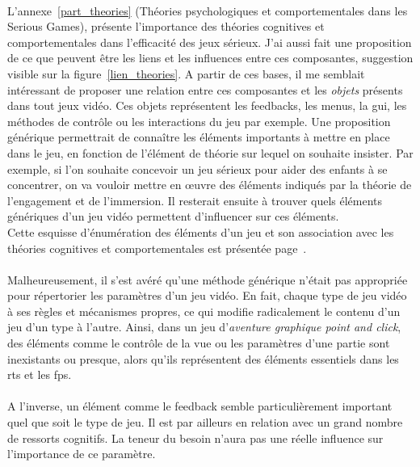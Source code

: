 	\paragraph{}
L'annexe~\ref{part_theories} (Théories psychologiques et comportementales dans les Serious Games), présente l'importance des théories cognitives et comportementales dans l'efficacité des jeux sérieux. J'ai aussi fait une proposition de ce que peuvent être les liens et les influences entre ces composantes, suggestion visible sur la figure~\ref{lien_theories}. A partir de ces bases, il me semblait intéressant de proposer une relation entre ces composantes et les \emph{objets} présents dans tout jeux vidéo. Ces objets représentent les \glspl{feedback}, les menus, la \gls{gui}, les méthodes de contrôle ou les interactions du jeu par exemple. Une proposition générique permettrait de connaître les éléments importants à mettre en place dans le jeu, en fonction de l'élément de théorie sur lequel on souhaite insister. Par exemple, si l'on souhaite concevoir un jeu sérieux pour aider des enfants à se concentrer, on va vouloir mettre en œuvre des éléments indiqués par la théorie de l'engagement et de l'immersion. Il resterait ensuite à trouver quels éléments génériques d'un jeu vidéo permettent d'influencer sur ces éléments.\\
Cette esquisse d'énumération des éléments d'un jeu et son association avec les théories cognitives et comportementales est présentée page~\pageref{matching}. 

\paragraph{}Malheureusement, il s'est avéré qu'une méthode générique n'était pas appropriée pour répertorier les paramètres d'un jeu vidéo. En fait, chaque type de jeu vidéo à ses règles et mécanismes propres, ce qui modifie radicalement le contenu d'un jeu d'un type à l'autre. Ainsi, dans un jeu d'\emph{aventure graphique point and click}, des éléments comme le contrôle de la vue ou les paramètres d'une partie sont inexistants ou presque, alors qu'ils représentent des éléments essentiels dans les \gls{rts} et les \gls{fps}.
\paragraph{}A l'inverse, un élément comme le \gls{feedback} semble particulièrement important quel que soit le type de jeu. Il est par ailleurs en relation avec un grand nombre de ressorts cognitifs. La teneur du besoin n'aura pas une réelle influence sur l'importance de ce paramètre.

